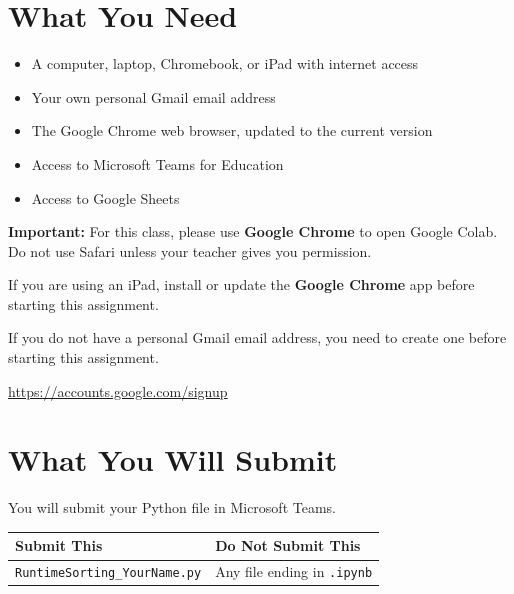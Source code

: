 \documentclass[11pt]{article}
\begin{document}
\section*{What You Need}

\begin{itemize}
    \item A computer, laptop, Chromebook, or iPad with internet access
    \item Your own personal Gmail email address
    \item The Google Chrome web browser, updated to the current version
    \item Access to Microsoft Teams for Education
    \item Access to Google Sheets
\end{itemize}

\noindent
\textbf{Important:} For this class, please use \textbf{Google Chrome} to open Google Colab. Do not use Safari unless your teacher gives you permission.

\vspace{0.1in}

\noindent
If you are using an iPad, install or update the \textbf{Google Chrome} app before starting this assignment.

\vspace{0.1in}

\noindent
If you do not have a personal Gmail email address, you need to create one before starting this assignment.

\begin{center}
    \url{https://accounts.google.com/signup}
\end{center}

\section*{What You Will Submit}

You will submit your Python file in Microsoft Teams.

\begin{center}
\begin{tabular}{|>{\raggedright}p{2.6in}|>{\raggedright\arraybackslash}p{3.4in}|}
\hline
\textbf{Submit This} & \textbf{Do Not Submit This} \\
\hline
\texttt{RuntimeSorting\_YourName.py} & Any file ending in \texttt{.ipynb} \\
\hline
\end{tabular}
\end{center}
\end{document}
